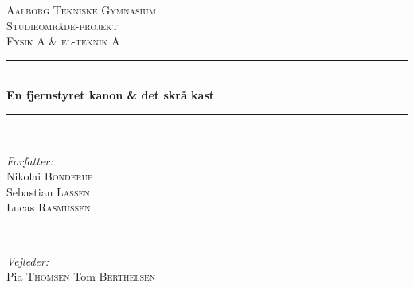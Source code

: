 


\begin{titlepage}

\newcommand{\HRule}{\rule{\linewidth}{0.5mm}} %

\center %
 

\textsc{\LARGE Aalborg Tekniske Gymnasium}\\[1.5cm] %
\textsc{\Large Studieområde-projekt}\\[0.5cm] %
\textsc{\large Fysik A \& el-teknik A}\\[0.5cm] %


\HRule \\[0.4cm]
{ \huge \bfseries En fjernstyret kanon \& det skrå kast  }\\[0.4cm] %
\HRule \\[1.5cm]
 

\begin{minipage}{0.4\textwidth}
\begin{flushleft} \large
\emph{Forfatter:}\\
Nikolai \textsc{Bonderup}\\ %
Sebastian \textsc{Lassen}\\
Lucas \textsc{Rasmussen}
\end{flushleft}
\end{minipage}
~
\begin{minipage}{0.4\textwidth}
\begin{flushright} \large
\emph{Vejleder:} \\
Pia \textsc{Thomsen} %
Tom \textsc{Berthelsen}\\
\end{flushright}
\end{minipage}\\[2cm]


\end{titlepage}
